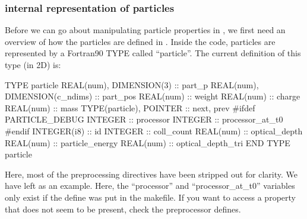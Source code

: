 \subsubsection{\texorpdfstring
  {{\EPOCH} internal representation of particles}
  {{EPOCH} internal representation of particles}}
\label{sec:partrep}
Before we can go about manipulating particle properties in
, we first need an overview of how the particles
are defined in {\EPOCH}.
Inside the code, particles are represented by a Fortran90 TYPE called
``particle''. The current definition of this type (in 2D) is:
\begin{boxverbatim}
  TYPE particle
    REAL(num), DIMENSION(3) :: part_p
    REAL(num), DIMENSION(c_ndims) :: part_pos
    REAL(num) :: weight
    REAL(num) :: charge
    REAL(num) :: mass
    TYPE(particle), POINTER :: next, prev
#ifdef PARTICLE_DEBUG
    INTEGER :: processor
    INTEGER :: processor_at_t0
#endif
    INTEGER(i8) :: id
    INTEGER :: coll_count
    REAL(num) :: optical_depth
    REAL(num) :: particle_energy
    REAL(num) :: optical_depth_tri
  END TYPE particle
\end{boxverbatim}
Here, most of the preprocessing directives have been stripped out for clarity.
We have left  as an example.
Here, the ``processor'' and ``processor\_at\_t0'' variables only exist if the
 define was put in
the makefile. If you want to access a property that does not seem to be
present, check the preprocessor defines.

